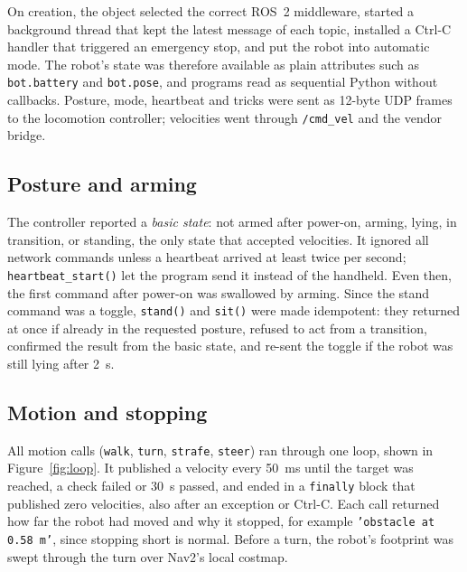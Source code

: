 \documentclass[11pt,a4paper]{article}
\begin{document}
On creation, the object selected the correct ROS~2 middleware, started a background thread that kept the
latest message of each topic, installed a Ctrl-C handler that triggered an emergency stop, and put the
robot into automatic mode. The robot's state was therefore available as plain attributes such as
\texttt{bot.battery} and \texttt{bot.pose}, and programs read as sequential Python without callbacks.
Posture, mode, heartbeat and tricks were sent as 12-byte UDP frames to the locomotion controller;
velocities went through \texttt{/cmd\_vel} and the vendor bridge.

\subsection{Posture and arming}

The controller reported a \emph{basic state}: not armed after power-on, arming, lying, in transition, or
standing, the only state that accepted velocities. It ignored all network commands unless a heartbeat
arrived at least twice per second; \texttt{heartbeat\_start()} let the program send it instead of the
handheld. Even then, the first command after power-on was swallowed by arming. Since the stand command
was a toggle, \texttt{stand()} and \texttt{sit()} were made idempotent: they returned at once if already in
the requested posture, refused to act from a transition, confirmed the result from the basic state, and
re-sent the toggle if the robot was still lying after 2~s.

\subsection{Motion and stopping}

All motion calls (\texttt{walk}, \texttt{turn}, \texttt{strafe}, \texttt{steer}) ran through one loop,
shown in Figure~\ref{fig:loop}. It published a velocity every 50~ms until the target was reached, a check
failed or 30~s passed, and ended in a \texttt{finally} block that published zero velocities, also after an
exception or Ctrl-C. Each call returned how far the robot had moved and why it stopped, for example
\texttt{'obstacle at 0.58 m'}, since stopping short is normal. Before a turn, the robot's footprint was
swept through the turn over Nav2's local costmap.
\end{document}
